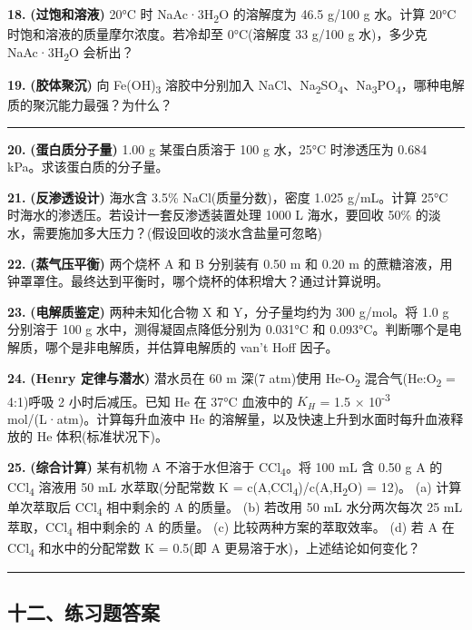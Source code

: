 \textbf{18.} \textbf{(过饱和溶液)} 20°C 时 NaAc·3H\textsubscript{2}O 的溶解度为 46.5 g/100 g 水。计算 20°C 时饱和溶液的质量摩尔浓度。若冷却至 0°C(溶解度 33 g/100 g 水)，多少克 NaAc·3H\textsubscript{2}O 会析出？

\textbf{19.} \textbf{(胶体聚沉)} 向 Fe(OH)\textsubscript{3} 溶胶中分别加入 NaCl、Na\textsubscript{2}SO\textsubscript{4}、Na\textsubscript{3}PO\textsubscript{4}，哪种电解质的聚沉能力最强？为什么？

\begin{center}\rule{0.5\linewidth}{0.5pt}\end{center}

\textbf{20.} \textbf{(蛋白质分子量)} 1.00 g 某蛋白质溶于 100 g 水，25°C 时渗透压为 0.684 kPa。求该蛋白质的分子量。

\textbf{21.} \textbf{(反渗透设计)} 海水含 3.5\% NaCl(质量分数)，密度 1.025 g/mL。计算 25°C 时海水的渗透压。若设计一套反渗透装置处理 1000 L 海水，要回收 50\% 的淡水，需要施加多大压力？(假设回收的淡水含盐量可忽略)

\textbf{22.} \textbf{(蒸气压平衡)} 两个烧杯 A 和 B 分别装有 0.50 m 和 0.20 m 的蔗糖溶液，用钟罩罩住。最终达到平衡时，哪个烧杯的体积增大？通过计算说明。

\textbf{23.} \textbf{(电解质鉴定)} 两种未知化合物 X 和 Y，分子量均约为 300 g/mol。将 1.0 g 分别溶于 100 g 水中，测得凝固点降低分别为 0.031°C 和 0.093°C。判断哪个是电解质，哪个是非电解质，并估算电解质的 van't Hoff 因子。

\textbf{24.} \textbf{(Henry 定律与潜水)} 潜水员在 60 m 深(7 atm)使用 He-O\textsubscript{2} 混合气(He:O\textsubscript{2} = 4:1)呼吸 2 小时后减压。已知 He 在 37°C 血液中的 \(K_H\) = 1.5 × 10\textsuperscript{-3} mol/(L·atm)。计算每升血液中 He 的溶解量，以及快速上升到水面时每升血液释放的 He 体积(标准状况下)。

\textbf{25.} \textbf{(综合计算)} 某有机物 A 不溶于水但溶于 CCl\textsubscript{4}。将 100 mL 含 0.50 g A 的 CCl\textsubscript{4} 溶液用 50 mL 水萃取(分配常数 K = c(A,CCl\textsubscript{4})/c(A,H\textsubscript{2}O) = 12)。
(a) 计算单次萃取后 CCl\textsubscript{4} 相中剩余的 A 的质量。
(b) 若改用 50 mL 水分两次每次 25 mL 萃取，CCl\textsubscript{4} 相中剩余的 A 的质量。
(c) 比较两种方案的萃取效率。
(d) 若 A 在 CCl\textsubscript{4} 和水中的分配常数 K = 0.5(即 A 更易溶于水)，上述结论如何变化？

\begin{center}\rule{0.5\linewidth}{0.5pt}\end{center}

\subsection{十二、练习题答案}\label{ux5341ux4e8cux7ec3ux4e60ux9898ux7b54ux6848}


